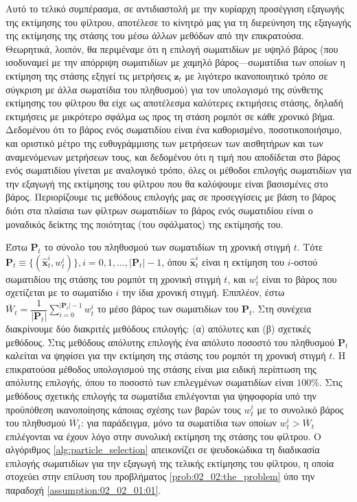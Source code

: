 Αυτό το τελικό συμπέρασμα, σε αντιδιαστολή με την κυρίαρχη προσέγγιση εξαγωγής
της εκτίμησης του φίλτρου, αποτέλεσε το κίνητρό μας για τη διερεύνηση της
εξαγωγής της εκτίμησης της στάσης του μέσω άλλων μεθόδων από την επικρατούσα.
Θεωρητικά, λοιπόν, θα περιμέναμε ότι η επιλογή σωματιδίων με υψηλό βάρος (που
ισοδυναμεί με την απόρριψη σωματιδίων με χαμηλό βάρος---σωματίδια των οποίων η
εκτίμηση της στάσης εξηγεί τις μετρήσεις $\bm{z}_t$ με λιγότερο ικανοποιητικό
τρόπο σε σύγκριση με άλλα σωματίδια του πληθυσμού) για τον υπολογισμό της
σύνθετης εκτίμησης του φίλτρου θα είχε ως αποτέλεσμα καλύτερες εκτιμήσεις
στάσης, δηλαδή εκτιμήσεις με μικρότερο σφάλμα ως προς τη στάση ρομπότ σε κάθε
χρονικό βήμα. Δεδομένου ότι το βάρος ενός σωματιδίου είναι ένα καθορισμένο,
ποσοτικοποιήσιμο, και οριστικό μέτρο της ευθυγράμμισης των μετρήσεων των
αισθητήρων και των αναμενόμενων μετρήσεων τους, και δεδομένου ότι η τιμή που
αποδίδεται στο βάρος ενός σωματιδίου γίνεται με αναλογικό τρόπο, όλες οι
μέθοδοι επιλογής σωματιδίων για την εξαγωγή της εκτίμησης του φίλτρου που θα
καλύψουμε είναι βασισμένες στο βάρος. Περιορίζουμε τις μεθόδους επιλογής μας σε
προσεγγίσεις με βάση το βάρος διότι στα πλαίσια των φίλτρων σωματιδίων το βάρος
ενός σωματιδίου είναι ο μοναδικός δείκτης της ποιότητας (του σφάλματος) της
εκτίμησής του.

Έστω $\bm{P}_t$ το σύνολο του πληθυσμού των σωματιδίων τη χρονική στιγμή $t$.
Τότε $\bm{P}_t \equiv \{(\hat{\bm{x}}_t^i, w_t^i)\}, i =
0,1,\dots,|\bm{P}_t|-1$, όπου $\hat{\bm{x}}_t^i$ είναι η εκτίμηση του $i$-οστού
σωματιδίου της στάσης του ρομπότ τη χρονική στιγμή $t$, και $w_t^i$ είναι το
βάρος που σχετίζεται με το σωματίδιο $i$ την ίδια χρονική στιγμή.  Επιπλέον,
έστω $\overline{W}_t = \dfrac{1}{|\bm{P}_t|}\sum\limits_{i=0}^{|\bm{P}_t|-1}
w_t^i$ το μέσο βάρος των σωματιδίων του $\bm{P}_t$. Στη συνέχεια διακρίνουμε
δύο διακριτές μεθόδους επιλογής: (α) απόλυτες και (β) σχετικές μεθόδους.
Στις μεθόδους απόλυτης επιλογής ένα απόλυτο ποσοστό του πληθυσμού
$\bm{P}_t$ καλείται να ψηφίσει για την εκτίμηση της στάσης του ρομπότ τη
χρονική στιγμή $t$. Η επικρατούσα μέθοδος υπολογισμού της στάσης είναι μια
ειδική περίπτωση της απόλυτης επιλογής, όπου το ποσοστό των επιλεγμένων
σωματιδίων είναι $100\%$.  Στις μεθόδους σχετικής επιλογής τα σωματίδια
επιλέγονται για ψηφοφορία υπό την προϋπόθεση ικανοποίησης κάποιας σχέσης των
βαρών τους $w_t^i$ με το συνολικό βάρος του πληθυσμού $\overline{W}_t$: για
παράδειγμα, μόνο τα σωματίδια των οποίων $w_t^i > \overline{W}_t$ επιλέγονται
να έχουν λόγο στην συνολική εκτίμηση της στάσης του φίλτρου. Ο αλγόριθμος
\ref{alg:particle_selection} απεικονίζει σε ψευδοκώδικα τη διαδικασία επιλογής
σωματιδίων για την εξαγωγή της τελικής εκτίμησης του φίλτρου, η οποία στοχεύει
στην επίλυση του προβλήματος \ref{prob:02_02:the_problem} ύπο την παραδοχή
\ref{assumption:02_02_01:01}.

